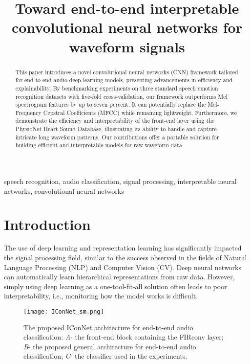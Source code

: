 
\title{Toward end-to-end interpretable convolutional neural networks for waveform signals}
\maketitle

\begin{abstract}
  This paper introduces a novel convolutional neural networks (CNN) framework tailored for end-to-end audio deep learning models, presenting advancements in efficiency and explainability. By benchmarking experiments on three standard speech emotion recognition datasets with five-fold cross-validation, our framework outperforms Mel spectrogram features by up to seven percent. It can potentially replace the Mel-Frequency Cepstral Coefficients (MFCC) while remaining lightweight. Furthermore, we demonstrate the efficiency and interpretability of the front-end layer using the PhysioNet Heart Sound Database, illustrating its ability to handle and capture intricate long waveform patterns. Our contributions offer a portable solution for building efficient and interpretable models for raw waveform data.

\end{abstract}

\begin{IEEEkeywords}
speech recognition, audio classification, signal processing, interpretable neural networks, convolutional neural networks
\end{IEEEkeywords}

\section{Introduction}
\label{sec:introduction}
The use of deep learning and representation learning has significantly impacted the signal processing field, similar to the success observed in the fields of Natural Language Processing (NLP) and Computer Vision (CV). Deep neural networks can automatically learn hierarchical representations from raw data. However, simply using deep learning as a one-tool-fit-all solution often leads to poor interpretability, i.e., monitoring how the model works is difficult. 

\begin{figure}
    \texttt{[image: IConNet\_sm.png]}
    \caption[IConNet]{The proposed IConNet architecture for end-to-end audio classification: \textit{A}- the front-end block containing the FIRconv layer; \textit{B}- the proposed general architecture for end-to-end audio classification; \textit{C}- the classifier used in the experiments.}
    \label{fig:iconnet}
\end{figure}

